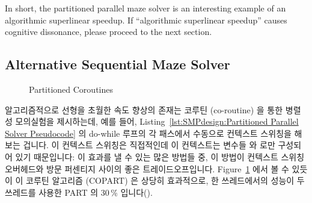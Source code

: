 In short, the partitioned parallel maze solver is an interesting example
of an algorithmic superlinear speedup.
If ``algorithmic superlinear speedup'' causes cognitive dissonance,
please proceed to the next section.
\fi

\subsection{Alternative Sequential Maze Solver}
\label{sec:SMPdesign:Alternative Sequential Maze Solver}

\begin{figure}[tb]
\centering
{}
\caption{Partitioned Coroutines}
\label{fig:SMPdesign:Partitioned Coroutines}
\end{figure}

알고리즘적으로 선형을 초월한 속도 향상의 존재는 코루틴 (co-routine) 을 통한
병렬성 모의실험을 제시하는데, 예를 들어, Listing~\ref{lst:SMPdesign:Partitioned
Parallel Solver Pseudocode} 의 do-while 루프의 각 패스에서 수동으로 컨텍스트
스위칭을 해보는 겁니다.
이 컨텍스트 스위칭은 직접적인데 이 컨텍스트는 변수들  와  로만
구성되어 있기 때문입니다: 이 효과를 낼 수 있는 많은 방법들 중, 이 방법이
컨텍스트 스위칭 오버헤드와 방문 퍼센티지 사이의 좋은 트레이드오프입니다.
Figure~\ref{fig:SMPdesign:Partitioned Coroutines} 에서 볼 수 있듯이 이 코루틴
알고리즘 (COPART) 은 상당히 효과적으로, 한 쓰레드에서의 성능이 두 쓰레드를
사용한 PART 의 30\,\% 입니다().
\iffalse


